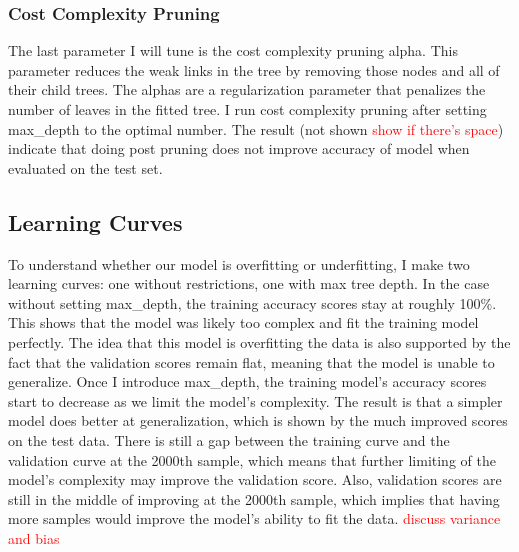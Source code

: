 \documentclass{article}
\newcommand\todo[1]{\textcolor{red}{#1}}
\begin{document}
\subsubsection*{Cost Complexity Pruning}
The last parameter I will tune is the cost complexity pruning alpha. This parameter reduces the weak links in the tree by removing those nodes and all of their child trees. The alphas are a regularization parameter that penalizes the number of leaves in the fitted tree. I run cost complexity pruning after setting max\_depth to the optimal number. The result (not shown \todo{show if there's space}) indicate that doing post pruning does not improve accuracy of model when evaluated on the test set. 

\subsection*{Learning Curves}

To understand whether our model is overfitting or underfitting, I make two learning curves: one without restrictions, one with max tree depth. In the case without setting max\_depth, the training accuracy scores stay at roughly 100\%. This shows that the model was likely too complex and fit the training model perfectly. The idea that this model is overfitting the data is also supported by the fact that the validation scores remain flat, meaning that the model is unable to generalize. Once I introduce max\_depth, the training model's accuracy scores start to decrease as we limit the model's complexity. The result is that a simpler model does better at generalization, which is shown by the much improved scores on the test data. There is still a gap between the training curve and the validation curve at the 2000th sample, which means that further limiting of the model's complexity may improve the validation score. Also, validation scores are still in the middle of improving at the 2000th sample, which implies that having more samples would improve the model's ability to fit the data. \todo{discuss variance and bias}
\end{document}
